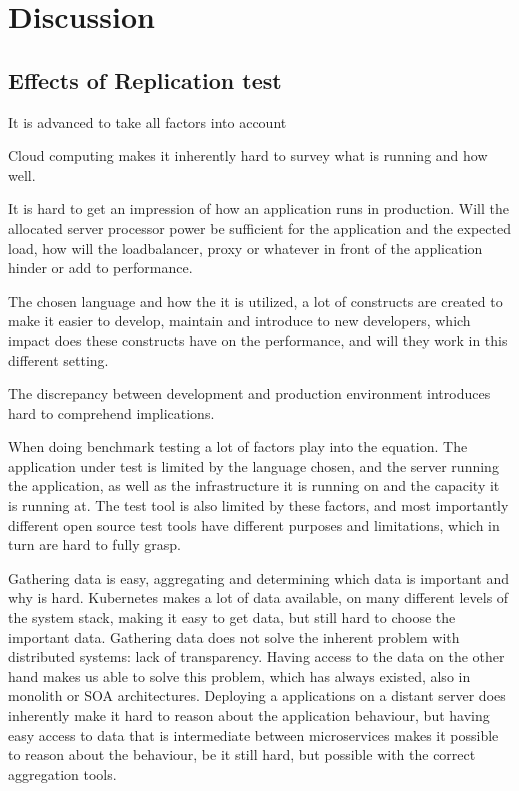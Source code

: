 \chapter{Discussion}
\label{ch:discussion}



\section{Effects of Replication test}
It is advanced to take all factors into account

Cloud computing makes it inherently hard to survey what is running and how well.

It is hard to get an impression of how an application runs in production. Will the allocated server processor power be sufficient for the application and the expected load, how will the loadbalancer, proxy or whatever in front of the application hinder or add to performance.

The chosen language and how the it is utilized, a lot of constructs are created to make it easier to develop, maintain and introduce to new developers, which impact does these constructs have on the performance, and will they work in this different setting.

The discrepancy between development and production environment introduces hard to comprehend implications.

When doing benchmark testing a lot of factors play into the equation. The application under test is limited by the language chosen, and the server running the application, as well as the infrastructure it is running on and the capacity it is running at. The test tool is also limited by these factors, and most importantly different open source test tools have different purposes and limitations, which in turn are hard to fully grasp.

Gathering data is easy, aggregating and determining which data is important and why is hard. Kubernetes makes a lot of data available, on many different levels of the system stack, making it easy to get data, but still hard to choose the important data. Gathering data does not solve the inherent problem with distributed systems: lack of transparency. Having access to the data on the other hand makes us able to solve this problem, which has always existed, also in monolith or SOA architectures. Deploying a applications on a distant server does inherently make it hard to reason about the application behaviour, but having easy access to data that is intermediate between microservices makes it possible to reason about the behaviour, be it still hard, but possible with the correct aggregation tools.


